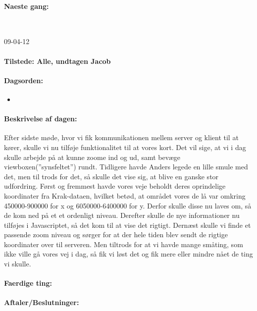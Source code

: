 \documentclass[a4paper,10pt,titlepage]{article}
\begin{document}
		\paragraph{Naeste gang:}\mbox{}\\
		
		\begin{center}
		09-04-12
		\end{center}
		
		\paragraph{Tilstede: Alle, undtagen Jacob}
		\paragraph{Dagsorden:}
		\begin{itemize}
					\item 
					
		\end{itemize}
		
		\paragraph{Beskrivelse af dagen:}
		Efter sidste møde, hvor vi fik kommunikationen mellem server og klient til at kører, skulle vi nu tilføje funktionalitet til at vores kort. Det vil sige, at vi i dag skulle arbejde på at kunne zoome ind og ud, samt bevæge viewboxen(”synsfeltet”) rundt. Tidligere havde Anders legede en lille smule med det, men til trods for det, så skulle det vise sig, at blive en ganske stor udfordring. Først og fremmest havde vores veje beholdt deres oprindelige koordinater fra Krak-dataen, hvilket betød, at området vores de lå var omkring 450000-900000 for x og 6050000-6400000 for y. Derfor skulle disse nu laves om, så de kom ned på et et ordenligt niveau. Derefter skulle de nye informationer nu tilføjes i Javascriptet, så det kom til at vise det rigtigt. Dernæst skulle vi finde et passende zoom niveau og sørger for at der hele tiden blev sendt de rigtige koordinater over til serveren. Men tiltrods for at vi havde mange småting, som ikke ville gå vores vej i dag, så fik vi løst det og fik mere eller mindre nået de ting vi skulle. 
		\paragraph{Faerdige ting:}
		
		\paragraph{Aftaler/Beslutninger:}
		
\end{document}
